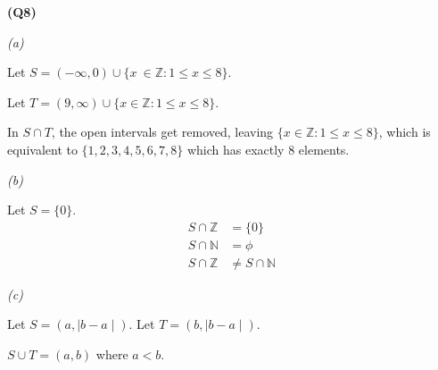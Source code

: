 \documentclass[12pt, letterpaper]{article}
\newcommand{\Z}{\mathbb{Z}}
\newcommand{\N}{\mathbb{N}}
\newcommand{\open}[1]{\left(#1\right)}
\begin{document}
\textbf{(Q8)}

\textit{(a)}

Let $S = \open{-\infty,0} \cup \{x \ \in \Z : 1 \leq x \leq 8\}$.

Let $T = \open{9, \infty} \cup \{x \in \Z : 1 \leq x \leq 8\}$.

In $S \cap T$, the open intervals get removed, leaving $\{x \in \Z : 1 \leq x \leq 8\}$,
which is equivalent to $\{1,2,3,4,5,6,7,8\}$ which has exactly 8 elements.

\textit{(b)}

Let $S = \{0\}$.
\begin{align*}
    S \cap \Z & = \{0\}\\
    S \cap \N & = \phi\\
    S \cap \Z & \neq S \cap \N
\end{align*}

\textit{(c)}

Let $S = \open{a, \mid b - a \mid}$.
Let $T = \open{b, \mid b - a \mid}$.

$S \cup T = \open{a, b}$ where $a < b$.
\end{document}
